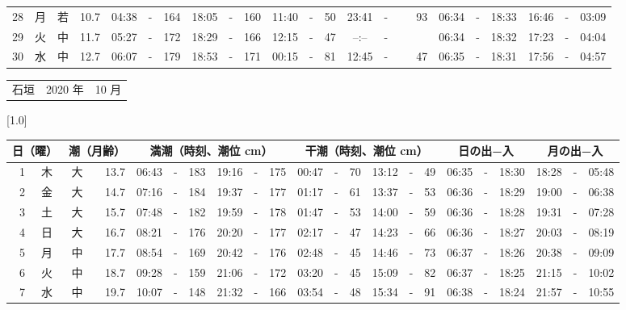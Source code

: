 \documentclass[12pt,a4j]{jsarticle}
\begin{document}
\begin{table}[htbp]
\begin{center}
{\begin{tabular}{|rc|cr|ccrccr|ccrccr|ccc|ccc|}
28 & 月 & 若 & 10.7 &  04:38 &-& 164 &  18:05 &-& 160 &  11:40 &-&  50 &  23:41 &-&  93 & 06:34 & -& 18:33 & 16:46 & -& 03:09 \\
29 & 火 & 中 & 11.7 &  05:27 &-& 172 &  18:29 &-& 166 &  12:15 &-&  47 &  --:-- &-&~~~~~ & 06:34 & -& 18:32 & 17:23 & -& 04:04 \\
30 & 水 & 中 & 12.7 &  06:07 &-& 179 &  18:53 &-& 171 &  00:15 &-&  81 &  12:45 &-&  47 & 06:35 & -& 18:31 & 17:56 & -& 04:57 \\
   \hline
   \end{tabular}}
   \end{center}
\end{table}
\newpage
 \begin{table}[htbp]
 \begin{center}
 \begin{tabular}{lcc}
 \LARGE{石垣}  & \large{2020 年} & \large{10 月} \\
 \end{tabular}
 \end{center}
 \begin{center}
    \scalebox{0.7}[1.0]{
    \begin{tabular}{|rc|cr|ccrccr|ccrccr|ccc|ccc|}
    \hline
    \multicolumn{2}{|c|}{日（曜）} & \multicolumn{2}{c|}{潮（月齢）} & \multicolumn{6}{c|}{満潮（時刻、潮位 cm）} & \multicolumn{6}{c|}{干潮（時刻、潮位 cm）} & \multicolumn{3}{c|}{日の出−入} &  \multicolumn{3}{c|}{月の出−入}\\
 \hline
 1 & 木 & 大 & 13.7 &  06:43 &-& 183 &  19:16 &-& 175 &  00:47 &-&  70 &  13:12 &-&  49 & 06:35 & -& 18:30 & 18:28 & -& 05:48 \\
 2 & 金 & 大 & 14.7 &  07:16 &-& 184 &  19:37 &-& 177 &  01:17 &-&  61 &  13:37 &-&  53 & 06:36 & -& 18:29 & 19:00 & -& 06:38 \\
 3 & 土 & 大 & 15.7 &  07:48 &-& 182 &  19:59 &-& 178 &  01:47 &-&  53 &  14:00 &-&  59 & 06:36 & -& 18:28 & 19:31 & -& 07:28 \\
 4 & 日 & 大 & 16.7 &  08:21 &-& 176 &  20:20 &-& 177 &  02:17 &-&  47 &  14:23 &-&  66 & 06:36 & -& 18:27 & 20:03 & -& 08:19 \\
 5 & 月 & 中 & 17.7 &  08:54 &-& 169 &  20:42 &-& 176 &  02:48 &-&  45 &  14:46 &-&  73 & 06:37 & -& 18:26 & 20:38 & -& 09:09 \\
 6 & 火 & 中 & 18.7 &  09:28 &-& 159 &  21:06 &-& 172 &  03:20 &-&  45 &  15:09 &-&  82 & 06:37 & -& 18:25 & 21:15 & -& 10:02 \\
 7 & 水 & 中 & 19.7 &  10:07 &-& 148 &  21:32 &-& 166 &  03:54 &-&  48 &  15:34 &-&  91 & 06:38 & -& 18:24 & 21:57 & -& 10:55 \\

\end{tabular}}
\end{center}
\end{table}
\end{document}
